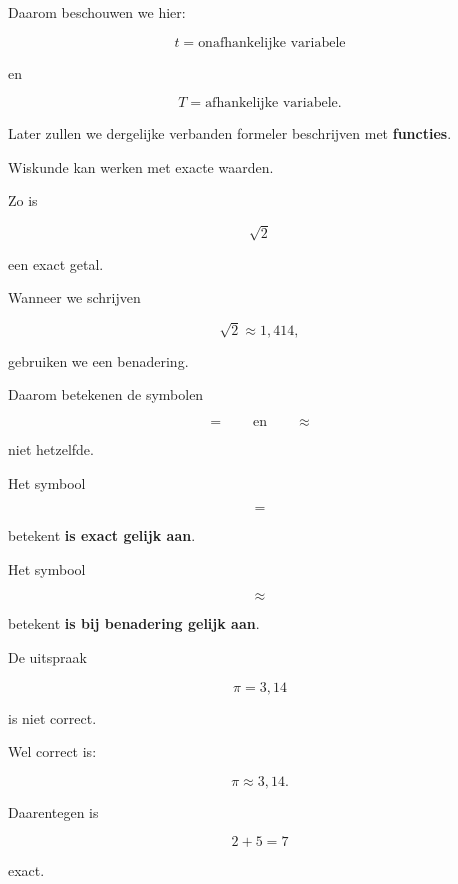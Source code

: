 \documentclass{ximera}
\begin{document}
Daarom beschouwen we hier:

\[
\boxed{
t=\text{onafhankelijke variabele}
}
\]

en

\[
\boxed{
T=\text{afhankelijke variabele}.
}
\]

Later zullen we dergelijke verbanden formeler beschrijven met
\textbf{functies}.




Wiskunde kan werken met exacte waarden.

Zo is

\[
\sqrt{2}
\]

een exact getal.

Wanneer we schrijven

\[
\sqrt{2}\approx1{,}414,
\]

gebruiken we een benadering.

Daarom betekenen de symbolen

\[
=
\qquad\text{en}\qquad
\approx
\]

niet hetzelfde.

\begin{eigenschap}

Het symbool

\[
=
\]

betekent \textbf{is exact gelijk aan}.

Het symbool

\[
\approx
\]

betekent \textbf{is bij benadering gelijk aan}.

\end{eigenschap}


\begin{voorbeeld}

De uitspraak

\[
\pi=3{,}14
\]

is niet correct.

Wel correct is:

\[
\pi\approx3{,}14.
\]

Daarentegen is

\[
2+5=7
\]

exact.

\end{voorbeeld}
\end{document}
